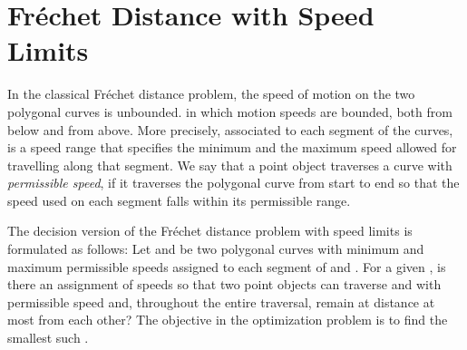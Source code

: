 \documentclass[12pt]{dalthesis}
\newcommand{\REM}[1]{}
\newcommand{\Frechet}{Fr\'echet }
\begin{document}
 

\REM{
Despite \Frechet distance is  a high quality similarity measure for polygonal curves, 
it is very sensitive to the presence of outliers. Consequently, researches have been carried out to formalize the notion of similarity among a set of curves that tolerate outliers. 
They are based on intersection of curves in local neighborhood \cite{Kreveld11}, topological features \cite{Buchin10}, or  adding flexibility 
to incorporate the existence of outliers \cite{Jaywalking}. In \cite{Jaywalking}, 
Driemel and Har-Peled discuss a new notion of robust Fr\'{e}chet distance, where they allow  shortcuts between vertices of one of the two curves, where  is a constant specified as an input parameter. 
They provide a constant factor approximation algorithm for finding the minimum \Frechet distance among all possible -shortcuts. 
One drawback of their approach is that a shortcut is selected without considering the length of the ignored part. Such shortcuts could remove, for example, 
90 percent of the curve. As a result, substantial information about the similarity of the original curves could be ignored. A second drawback of their approach is
that the shortcuts are only allowed to one of the curves. Since noise could be present in both curves, shortcuts may be required on both to achieve a good result. 
}













\clearpage{}



\clearpage{}\chapter{\Frechet Distance with Speed Limits}
\label{ch:speedFD}
In the classical \Frechet distance problem, 
the speed of motion on the two polygonal curves is unbounded.
 in which  motion speeds are bounded, both from below and from above. 
More precisely, associated to each segment of the curves, 
is a speed range
that specifies the minimum and the maximum speed allowed for travelling along that segment.
We say that a point object traverses a curve with \emph{permissible speed},
if it traverses the polygonal curve from start to end
so that the speed used on each segment falls within its permissible range.

The decision version of the \Frechet distance problem with speed limits is formulated as follows:
Let  and  be two polygonal curves with minimum and maximum permissible speeds
assigned to each segment of  and .
For a given , is there an assignment of speeds so that two point objects
can traverse  and  with permissible speed and, throughout the entire
traversal, remain at distance at most  from each other?
The objective in the optimization problem is to find the smallest such .
\end{document}
